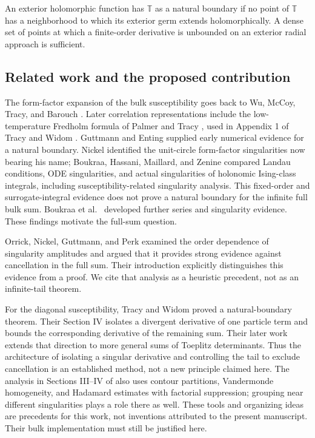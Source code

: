 \documentclass[11pt]{article}
\numberwithin{equation}{section}
\theoremstyle{definition}
\newcommand{\T}{\mathbb T}
\begin{document}
An exterior holomorphic function has \(\T\) as a natural boundary if no
point of \(\T\) has a neighborhood to which its exterior germ extends
holomorphically. A dense set of points at which a finite-order derivative
is unbounded on an exterior radial approach is sufficient.

\subsection{Related work and the proposed contribution}
The form-factor expansion of the bulk susceptibility goes back to
Wu, McCoy, Tracy, and Barouch \cite{WMTB1976}. Later correlation
representations include the low-temperature Fredholm formula of
Palmer and Tracy \cite{PalmerTracy1981}, used in Appendix 1 of
Tracy and Widom \cite{TW2014}. Guttmann and Enting
\cite{GuttmannEnting1996} supplied early numerical evidence for a
natural boundary. Nickel \cite{Nickel1999,Nickel2000} identified
the unit-circle form-factor singularities now bearing his name;
Boukraa, Hassani, Maillard, and Zenine \cite{Boukraa2007}
compared Landau conditions, ODE singularities, and actual singularities
of holonomic Ising-class integrals, including susceptibility-related
singularity analysis. This fixed-order and surrogate-integral evidence
does not prove a natural boundary for the infinite full bulk sum.
Boukraa et al.\ \cite{Boukraa2008} developed further series and
singularity evidence. These findings motivate the full-sum question.

Orrick, Nickel, Guttmann, and Perk \cite[Section~3.2]{Orrick2001}
examined the order dependence of singularity amplitudes and argued
that it provides strong evidence against cancellation in the full sum.
Their introduction explicitly distinguishes this evidence from a proof.
We cite that analysis as a heuristic precedent, not as an infinite-tail
theorem.

For the diagonal susceptibility, Tracy and Widom \cite{TW2013}
proved a natural-boundary theorem. Their Section IV isolates a
divergent derivative of one particle term and bounds the corresponding
derivative of the remaining sum. Their later work
\cite{TW2017Toeplitz} extends that direction to more general sums
of Toeplitz determinants. Thus the architecture of isolating a
singular derivative and controlling the tail to exclude cancellation
is an established method, not a new principle claimed here.
The analysis in Sections III--IV of \cite{TW2017Toeplitz} also uses
contour partitions, Vandermonde homogeneity, and Hadamard estimates
with factorial suppression; grouping near different singularities
plays a role there as well. These tools and organizing ideas are
precedents for this work, not inventions attributed to the present
manuscript. Their bulk implementation must still be justified here.
\end{document}
